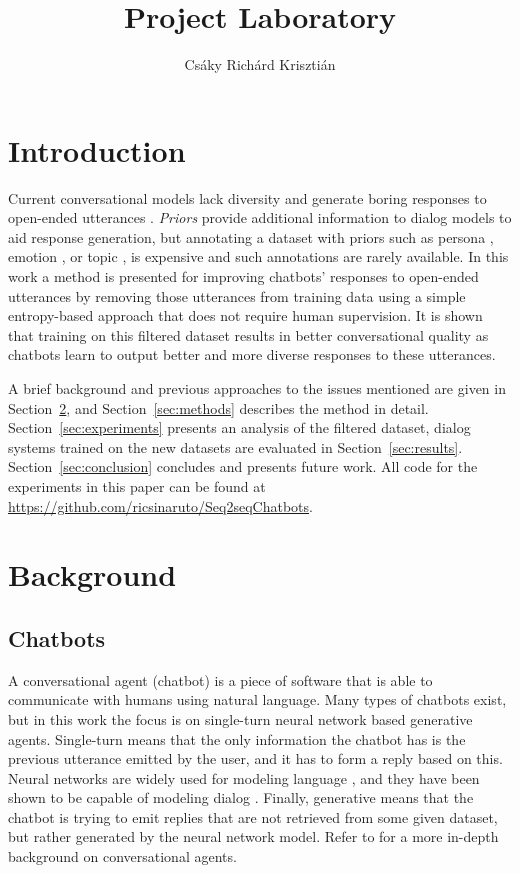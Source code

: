 \documentclass[11pt,a4paper]{article}
\title{Project Laboratory}
\author{Csáky Richárd Krisztián \\}
\date{}
\begin{document}
\maketitle

\section{Introduction}
Current conversational models lack diversity and generate boring
responses to open-ended utterances \cite{Li:2015c,Wei:2017, Shao:2017b}.
{\it Priors} provide additional information to dialog models to
aid response generation, but annotating a dataset with priors such
as persona \cite{Li:2016a}, emotion
\cite{Zhou:2017}, or topic \cite{Xing:2017}, is expensive and such
annotations are rarely available. In this work a method is presented for improving
chatbots' responses to open-ended utterances by removing those
utterances from
training data using a simple entropy-based approach that
does not require human supervision. It is shown that training
on this filtered dataset results in better conversational quality as
chatbots learn to output better and more diverse responses to these
utterances.

A brief background and previous approaches to the issues mentioned are given in
Section~\ref{sec:background}, and Section~\ref{sec:methods} describes the
method in detail.
Section~\ref{sec:experiments} presents an analysis of the filtered
dataset, dialog systems trained on the new datasets are evaluated in
Section~\ref{sec:results}. Section~\ref{sec:conclusion} concludes and presents
future work. All code for the experiments in this paper can be found at \url{https://github.com/ricsinaruto/Seq2seqChatbots}.


\section{Background}
\label{sec:background}
\subsection{Chatbots}
A conversational agent (chatbot) is a piece of software that is able to communicate with humans using natural language. Many types of chatbots exist, but in this work the focus is on single-turn neural network based generative agents. Single-turn means that the only information the chatbot has is the previous utterance emitted by the user, and it has to form a reply based on this. Neural networks are widely used for modeling language \cite{Mikolov:2010}, and they have been shown to be capable of modeling dialog \cite{Vinyals:2015}. Finally, generative means that the chatbot is trying to emit replies that are not retrieved from some given dataset, but rather generated by the neural network model. Refer to \cite{Csaky:2017} for a more in-depth background on conversational agents.
\end{document}

